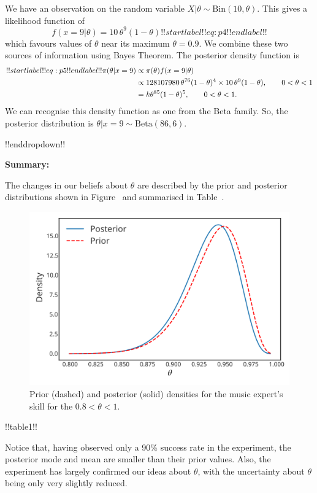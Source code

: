 {We have an observation on the random variable $X|\theta\sim
        \mathrm{Bin}(10,\theta)$. This gives a likelihood function of
        \begin{equation}
        f(x=9|\theta)=10\,\theta^9(1-\theta)
        !!startlabel!! eq:p4 !!endlabel!!
        \end{equation}
        which favours values of $\theta$ near its maximum $\theta=0.9$. We combine these two sources of information using Bayes Theorem. The posterior density function is 
        \begin{align}
        !!startlabel!! eq:p5 !!endlabel!!
        \pi(\theta|x=9)&\propto\pi(\theta)f(x=9|\theta) \notag \\
        &\propto 128107980\,\theta^{76}(1-\theta)^4\times 10\,\theta^9(1-\theta),
        \quad\quad 0<\theta<1 \notag \\
        &=k\theta^{85}(1-\theta)^5,\quad\quad 0<\theta<1.
        \end{align}
        We can recognise this density function as one from the Beta family. So, the posterior distribution is $\theta|x=9\sim
        \mathrm{Beta}(86,6)$.

!!enddropdown!!

\textbf{Summary:}

The changes in our beliefs about $\theta$ are described by the prior and posterior distributions shown in Figure~ and summarised in Table~.
\begin{figure}[h!]

\includegraphics{images/priorposterior1.svg}
\caption{Prior (dashed) and posterior (solid) densities for the music expert's skill for the $0.8 < \theta < 1$.}
\label{fig:betaplot4}

\end{figure}



!!table1!!

Notice that, having observed only a 90\% success rate in the experiment, the posterior mode and mean are smaller than their prior values. Also, the experiment has largely confirmed our ideas about $\theta$, with the uncertainty about $\theta$ being only very slightly reduced.}




